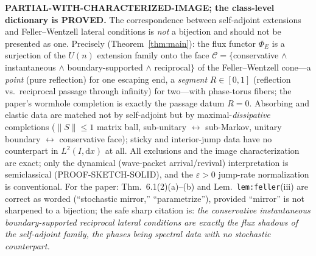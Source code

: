 \documentclass[11pt]{article}
\theoremstyle{remark}
\newcommand{\dd}{\mathrm{d}}
\begin{document}
\noindent\textbf{PARTIAL-WITH-CHARACTERIZED-IMAGE; the class-level
dictionary is PROVED.}  The correspondence between self-adjoint
extensions and Feller--Wentzell lateral conditions is \emph{not} a
bijection and should not be presented as one.  Precisely
(Theorem~\ref{thm:main}): the flux functor $\Phi_E$ is a surjection of
the $U(n)$ extension family onto the face
$\mathcal C=\{$conservative $\wedge$ instantaneous $\wedge$
boundary-supported $\wedge$ reciprocal$\}$ of the Feller--Wentzell
cone---a \emph{point} (pure reflection) for one escaping end, a
\emph{segment} $R\in[0,1]$ (reflection vs.\ reciprocal passage through
infinity) for two---with phase-torus fibers; the paper's wormhole
completion is exactly the passage datum $R=0$.  Absorbing and elastic
data are matched not by self-adjoint but by maximal-\emph{dissipative}
completions ($\|S\|\le1$ matrix ball, sub-unitary
$\leftrightarrow$ sub-Markov, unitary boundary $\leftrightarrow$
conservative face); sticky and interior-jump data have no counterpart
in $L^2(I,\dd x)$ at all.  All exclusions and the image
characterization are exact; only the dynamical (wave-packet
arrival/revival) interpretation is semiclassical
(PROOF-SKETCH-SOLID), and the $\varepsilon>0$ jump-rate normalization
is conventional.  For the paper: Thm.~6.1(2)(a)--(b) and
Lem.~\texttt{lem:feller}(iii) are correct as worded (``stochastic
mirror,'' ``parametrize''), provided ``mirror'' is not sharpened to a
bijection; the safe sharp citation is: \emph{the conservative
instantaneous boundary-supported reciprocal lateral conditions are
exactly the flux shadows of the self-adjoint family, the phases being
spectral data with no stochastic counterpart.}
\end{document}

